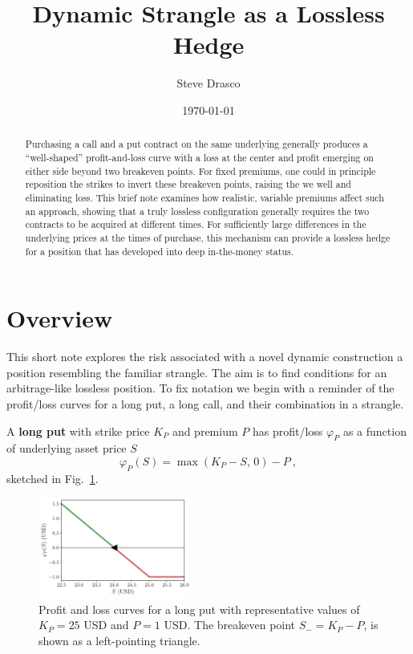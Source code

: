 \documentclass[aps,reprint]{revtex4-2}
\begin{document}
\title{Dynamic Strangle as a Lossless Hedge}
\author{Steve Drasco}
\date{\today}

\begin{abstract}
Purchasing a call and a put contract on the same underlying generally produces a “well-shaped” profit-and-loss curve with a loss at the center and profit emerging on either side beyond two breakeven points. For fixed premiums, one could in principle reposition the strikes to invert these breakeven points, raising the we well and eliminating loss. This brief note examines how realistic, variable premiums affect such an approach, showing that a truly lossless configuration generally requires the two contracts to be acquired at different times. For sufficiently large differences in the underlying prices at the times of purchase, this mechanism can provide a lossless hedge for a position that has developed into deep in-the-money status.
\end{abstract}

\maketitle

\section{Overview}

This short note explores the risk associated with a novel dynamic construction a position resembling the familiar strangle.  The aim is to find conditions for an arbitrage-like lossless position.  To fix notation we begin with a reminder of the profit/loss curves for a long put, a long call, and their combination in a strangle. 

A \textbf{long put} with strike price $K_P$ and premium $P$ has profit/loss $\varphi_P$ as a function of underlying asset price $S$
\begin{equation}
\varphi_P(S) = \max(K_P - S,\,0) - P~,
\end{equation}
sketched in Fig.~\ref{fig:put}.
\begin{figure}[hb]
    \centering
    \includegraphics[width=0.45\textwidth]{figs/put.pdf}
    \caption{Profit and loss curves for a long put with representative values of $K_P = 25$ USD and $P = 1$ USD.  The breakeven point $S_- = K_P - P$, is shown as a left-pointing triangle.}
    \label{fig:put}
\end{figure}
\end{document}
